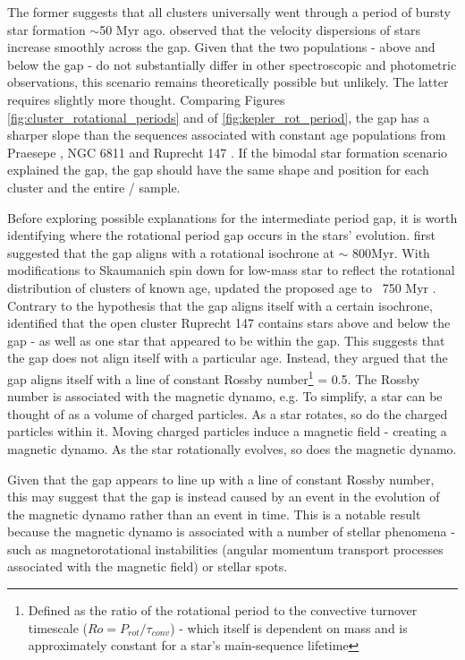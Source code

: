 The former suggests that all clusters universally went through a period of bursty star formation $\sim$50 Myr ago. 
\citet{angus_exploring_2020} observed that the velocity dispersions of stars increase smoothly across the gap.
Given that the two populations - above and below the gap - do not substantially differ in other spectroscopic and photometric observations, this scenario remains theoretically possible but unlikely.
The latter requires slightly more thought. Comparing Figures \ref{fig:cluster_rotational_periods} and of \ref{fig:kepler_rot_period}, the gap has a sharper slope than the sequences associated with constant age populations from Praesepe \citep{douglas_poking_2017,douglas_k2_2019}, NGC 6811 \citep{curtis_temporary_2019} and Ruprecht 147 \citep{curtis_when_2020}. 
If the bimodal star formation scenario explained the gap, the gap should have the same shape and position for each cluster and the entire \ktoo/\kepler{} sample.

Before exploring possible explanations for the intermediate period gap, it is worth identifying where the rotational period gap occurs in the stars' evolution.
\citet{reinhold_transition_2019} first suggested that the gap aligns with a rotational isochrone at $\sim$ 800Myr.
With \citet{spada_angular_2016} modifications to Skaumanich spin down for low-mass star to reflect the rotational distribution of clusters of known age, updated the proposed age to ~750 Myr \citep{reinhold_transition_2019}.
Contrary to the hypothesis that the gap aligns itself with a certain isochrone, \citet{curtis_when_2020} identified that the open cluster Ruprecht 147 contains stars above and below the gap - as well as one star that appeared to be within the gap.
This suggests that the gap does not align itself with a particular age.
Instead, they argued that the gap aligns itself with a line of constant Rossby number\footnote{Defined as the ratio of the rotational period to the convective turnover timescale ($Ro = P_{rot}/\tau_{conv}$) - which itself is dependent on mass and is approximately constant for a star's main-sequence lifetime} = 0.5.
The Rossby number is associated with the magnetic dynamo, e.g. \citet{noyes_rotation_1984, montesinos_new_2001, augustson_rossby_2019}
To simplify, a star can be thought of as a volume of charged particles.
As a star rotates, so do the charged particles within it.
Moving charged particles induce a magnetic field - creating a magnetic dynamo.
As the star rotationally evolves, so does the magnetic dynamo.

Given that the gap appears to line up with a line of constant Rossby number, this may suggest that the gap is instead caused by an event in the evolution of the magnetic dynamo rather than an event in time.
This is a notable result because the magnetic dynamo is associated with a number of stellar phenomena - such as magnetorotational instabilities (angular momentum transport processes associated with the magnetic field) or stellar spots.

